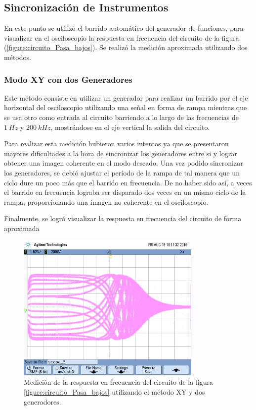 \documentclass[11pt, a4paper]{article}
\begin{document}
\break
\subsection*{Sincronización de Instrumentos}
En este punto se utilizó el barrido automático del generador de funciones, para visualizar en el osciloscopio la respuesta en frecuencia del circuito de la figura (\ref{figure:circuito_Pasa_bajos}). Se realizó la medición aproximada utilizando dos métodos.

\subsubsection*{Modo XY con dos Generadores}
Este método consiste en utilizar un generador para realizar un barrido por el eje horizontal del osciloscopio utilizando una señal en forma de rampa mientras que se usa otro como entrada al circuito barriendo a lo largo de las frecuencias de $1 \ Hz$ y $200 \ kHz$, mostrándose en el eje vertical la salida del circuito.

Para realizar esta medición hubieron varios intentos ya que se presentaron mayores dificultades a la hora de sincronizar los generadores entre si y lograr obtener una imagen coherente en el modo deseado. Una vez podido sincronizar los generadores, se debió ajustar el período de la rampa de tal manera que un ciclo dure un poco más que el barrido en frecuencia. De no haber sido así, a veces el barrido en frecuencia lograba ser disparado dos veces en un mismo ciclo de la rampa, proporcionando una imagen no coherente en el osciloscopio.

Finalmente, se logró visualizar la respuesta en frecuencia del circuito de forma aproximada

\begin{figure}[H]
	\centering
	\includegraphics[width=0.8\textwidth,trim={0.5cm 5cm  1 5cm},clip]{ej3xy.png}
	\caption{Medición de la respuesta en frecuencia del circuito de la figura \ref{figure:circuito_Pasa_bajos} utilizando el método XY y dos generadores.} 
	\label{graf:osci_freq_alta}
\end{figure}
\end{document}
